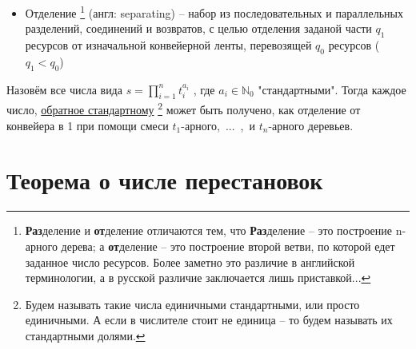\begin{itemize}
		
	\item Отделение%
	\footnote{\textbf{Раз}деление и \textbf{от}деление отличаются тем, что \textbf{Раз}деление -- это построение n-арного дерева; а \textbf{от}деление -- это построение второй ветви, по которой едет заданное число ресурсов. Более заметно это различие в английской терминологии, а в русской различие заключается лишь приставкой...}
	(англ: separating) -- набор из последовательных и параллельных разделений, соединений и возвратов, с целью отделения заданой части $q_1$ ресурсов от изначальной конвейерной ленты, перевозящей $q_0$ ресурсов ($q_1 < q_0$)
		
		
\end{itemize}














\vspace{0.5in}


Назовём все числа вида $s = \prod_{i=1}^n t_i^{a_i}$ , где $a_i \in \mathbb{N}_0$ "стандартными". Тогда каждое число, \underline{обратное стандартному}%
\footnote{Будем называть такие числа единичными стандартными, или просто единичными. А если в числителе стоит не единица -- то будем называть их стандартными долями.} 
может быть получено, как отделение от конвейера в 1 при помощи смеси $t_1$-арного,~...~,~и $t_n$-арного деревьев.






\vspace{0.5in}

\section{Теорема о числе перестановок}

